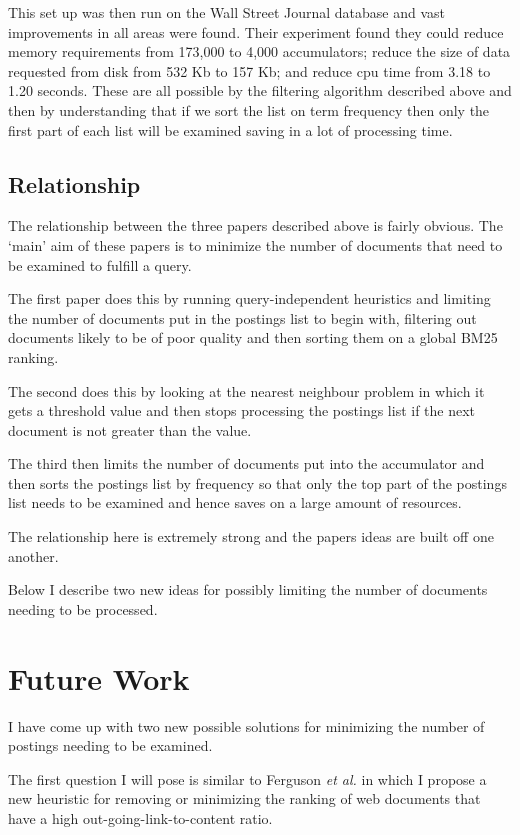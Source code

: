 \documentclass{acm_proc_article-sp}
\begin{document}
This set up was then run on the Wall Street Journal database and vast improvements in all areas were found. Their experiment found they could reduce memory requirements from 173,000 to 4,000 accumulators; reduce the size of data requested from disk from 532 Kb to 157 Kb; and reduce cpu time from 3.18 to 1.20 seconds. These are all possible by the filtering algorithm described above and then by understanding that if we sort the list on term frequency then only the first part of each list will be examined saving in a lot of processing time.

\subsection{Relationship}

The relationship between the three papers described above is fairly obvious. The `main' aim of these papers is to minimize the number of documents that need to be examined to fulfill a query. 

The first paper does this by running query-independent heuristics and limiting the number of documents put in the postings list to begin with, filtering out documents likely to be of poor quality and then sorting them on a global BM25 ranking.

The second does this by looking at the nearest neighbour problem in which it gets a threshold value and then stops processing the postings list if the next document is not greater than the value.

The third then limits the number of documents put into the accumulator and then sorts the postings list by frequency so that only the top part of the postings list needs to be examined and hence saves on a large amount of resources.

The relationship here is extremely strong and the papers ideas are built off one another.

Below I describe two new ideas for possibly limiting the number of documents needing to be processed.

\section{Future Work}
I have come up with two new possible solutions for minimizing the number of postings needing to be examined. 

The first question I will pose is similar to Ferguson \emph{et al.} in which I propose a new heuristic for removing or minimizing the ranking of web documents that have a high out-going-link-to-content ratio. 
\end{document}
